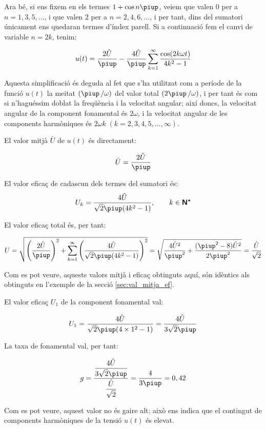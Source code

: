 \begin{exemple}
    Ara bé, si ens fixem en els termes $1+\cos n \piup$, veiem que valen 0
    per a $n=1,3,5,\ldots$, i que valen 2 per a $n=2,4,6,\ldots$, i per tant, dins
    del sumatori únicament ens quedaran termes d'índex parell. Si a
    continuació fem el canvi de variable $n=2k$, tenim:

    \[
    u(t) = \frac{2\hat{U}}{\piup} - \frac{4\hat{U}}{\piup} \sum_{k=1}^\infty
          \frac{\cos(2 k \omega t)}{4k^2-1}
    \]

    Aquesta simplificació és deguda al fet que s'ha utilitzat com a
    període de la funció $u(t)$ la meitat $(\piup\,/\omega)$ del valor total
    $(2\piup\,/\omega)$, i per tant és com si n'haguéssim doblat la
    freqüència i la velocitat angular; així doncs, la velocitat angular
    de la component fonamental és $2\omega$, i la velocitat angular de
    les components harmòniques és $2\omega k \;(k=2,3,4,5,\ldots,\infty)$.

    El valor mitjà $\bar{U}$ de $u(t)$ és directament:

    \[
        \bar{U} = \frac{2\hat{U}}{\piup}
    \]

    El valor eficaç de cadascun dels termes del sumatori és:
    \[
        U_k =\frac{4\hat{U}}{\sqrt{2}\piup(4k^2-1)},
        \qquad k \in \mathsfb{N^*}
    \]

    El valor eficaç total és, per tant:

    \[
        U=\sqrt{\left(\frac{2\hat{U}}{\piup}\right)^2 + \sum_{k=1}^\infty
        \left(\frac{4\hat{U}}{\sqrt{2}\piup(4k^2-1)}\right)^2} =
        \sqrt{\frac{4\hat{U}^2}{\piup^2} + \frac{(\piup^2-8)\hat{U}^2}{2\piup^2}
        }= \frac{\hat{U}}{\sqrt{2}}
    \]

    Com es pot veure, aquests valors mitjà i eficaç obtinguts aquí, són
    idèntics als obtinguts en l'exemple de la secció
    \ref{sec:val_mitja_ef}.

    El valor eficaç $U_1$ de la component fonamental val:

    \[
        U_1 =\frac{4\hat{U}}{\sqrt{2}\piup(4\times 1^2-1)} =
        \frac{4\hat{U}}{3\sqrt{2}\piup}
    \]

    La taxa de fonamental val, per tant:

    \[
        g =
        \frac{\dfrac{4\hat{U}}{3\sqrt{2}\piup}}{\dfrac{\hat{U}}{\sqrt{2}}}
        =\frac{4}{3\piup} = 0,{42}
    \]

    Com es pot veure, aquest valor no és gaire alt; això ens indica que
    el contingut de components harmòniques de la tensió $u(t)$ és
    elevat.
\end{exemple}


